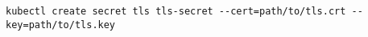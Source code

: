 \begin{verbatim}
kubectl create secret tls tls-secret --cert=path/to/tls.crt --key=path/to/tls.key
\end{verbatim}